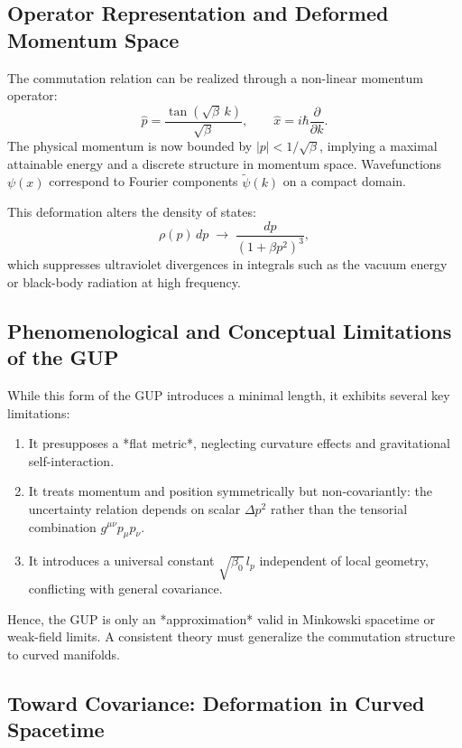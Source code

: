 \documentclass[11pt,oneside]{book}
\numberwithin{equation}{chapter}
\begin{document}
\subsection*{Operator Representation and Deformed Momentum Space}

The commutation relation can be realized through a non-linear momentum operator:
\begin{equation}
\hat{p} = \frac{\tan(\sqrt{\beta}\,k)}{\sqrt{\beta}},\qquad
\hat{x} = i\hbar\frac{\partial}{\partial k}.
\end{equation}
The physical momentum is now bounded by $|p|<1/\sqrt{\beta}$, implying a maximal attainable energy and a discrete structure in momentum space.  
Wavefunctions $\psi(x)$ correspond to Fourier components $\tilde{\psi}(k)$ on a compact domain.

This deformation alters the density of states:
\begin{equation}
\rho(p)\,dp \;\rightarrow\;
\frac{dp}{(1+\beta p^2)^3},
\end{equation}
which suppresses ultraviolet divergences in integrals such as the vacuum energy or black-body radiation at high frequency.

\subsection*{Phenomenological and Conceptual Limitations of the GUP}

While this form of the GUP introduces a minimal length, it exhibits several key limitations:

\begin{enumerate}
\item It presupposes a *flat metric*, neglecting curvature effects and gravitational self-interaction.  
\item It treats momentum and position symmetrically but non-covariantly: the uncertainty relation depends on scalar $\Delta p^2$ rather than the tensorial combination $g^{\mu\nu}p_\mu p_\nu$.  
\item It introduces a universal constant $\sqrt{\beta_0}\,l_p$ independent of local geometry, conflicting with general covariance.
\end{enumerate}

Hence, the GUP is only an *approximation* valid in Minkowski spacetime or weak-field limits.  
A consistent theory must generalize the commutation structure to curved manifolds.

\subsection*{Toward Covariance: Deformation in Curved Spacetime}
\end{document}
